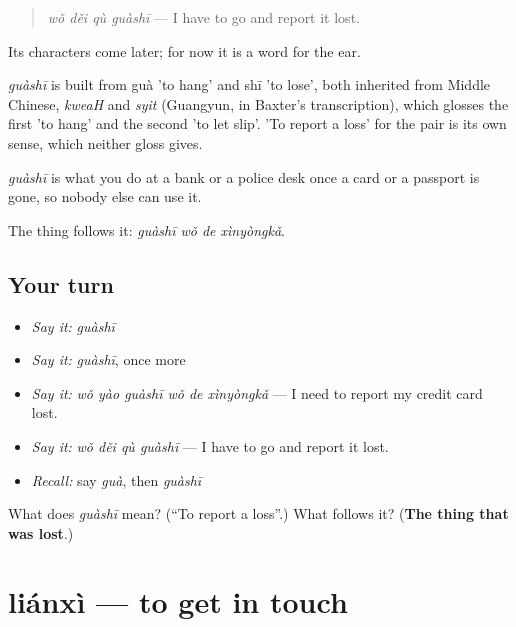 \begin{quote}
\emph{wǒ děi qù guàshī} — I have to go and report it lost.
\end{quote}

Its characters come later; for now it is a word for the ear.

\begin{cousinweb}
\emph{guàshī} is built from guà 'to hang' and shī 'to lose', both inherited from Middle Chinese, \emph{kweaH} and \emph{syit} (Guangyun, in Baxter's transcription), which glosses the first 'to hang' and the second 'to let slip'. 'To report a loss' for the pair is its own sense, which neither gloss gives.
\end{cousinweb}

\begin{grammarlens}[title={What you've built}]
\emph{guàshī} is what you do at a bank or a police desk once a card or a passport is gone, so nobody else can use it.

The thing follows it: \emph{guàshī wǒ de xìnyòngkǎ}.
\end{grammarlens}

\subsection*{Your turn}
\begin{itemize}
\raggedright
  \item \emph{Say it:} \emph{guàshī}
  \item \emph{Say it:} \emph{guàshī}, once more
  \item \emph{Say it:} \emph{wǒ yào guàshī wǒ de xìnyòngkǎ} — I need to report my credit card lost.
  \item \emph{Say it:} \emph{wǒ děi qù guàshī} — I have to go and report it lost.
  \item \emph{Recall:} say \emph{guà}, then \emph{guàshī}
\end{itemize}

\begin{tcolorbox}[breakable,colback=teal!4,colframe=teal!35!black,title={Before you move on}]
What does \emph{guàshī} mean? (\textquotedblleft{}To report a loss\textquotedblright{}.) What follows it? (\textbf{The thing that was lost}.)
\end{tcolorbox}
\section[liánxì]{liánxì — to get in touch}

